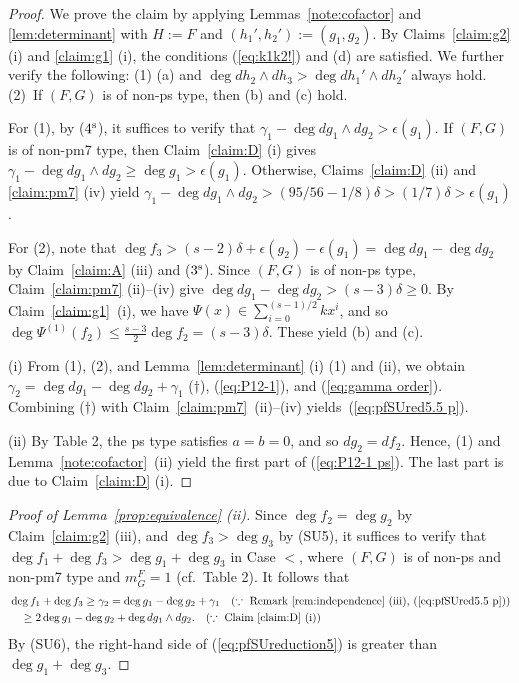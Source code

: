 \documentclass{amsart}
\theoremstyle{plain}
\theoremstyle{definition}
\newcommand{\ep}{\epsilon}
\begin{document}
\begin{proof}
We prove the claim by applying 
Lemmas~\ref{note:cofactor} and \ref{lem:determinant} 
with $H:=F$ and $(h_1',h_2'):=(g_1,g_2)$. 
By Claims~\ref{claim:g2} (i) and \ref{claim:g1} (i), 
the conditions 
(\ref{eq:k1k2!}) and (d) are satisfied. 
We further verify the following: 
(1) (a) and $\deg dh_2\wedge dh_3>\deg dh_1'\wedge dh_2'$ 
always hold. 
(2)~If $(F,G)$ is of non-ps type, 
then (b) and (c) hold. 



For (1), 
by ($4^{\rm s}$), 
it suffices to verify that 
$\gamma _1-\deg dg_1\wedge dg_2>\ep (g_1)$. 
If $(F,G)$ is of non-pm7 type, 
then Claim~\ref{claim:D} (i) gives 
$\gamma _1-\deg dg_1\wedge dg_2\ge \deg g_1>\ep (g_1)$. 
Otherwise, 
Claims~\ref{claim:D} (ii) and \ref{claim:pm7} (iv) yield 
$\gamma _1-\deg dg_1\wedge dg_2>(95/56-1/8)\delta >(1/7)\delta >\ep (g_1)$. 



For (2), 
note that 
$\deg f_3>(s-2)\delta +\ep (g_2)-\ep (g_1)=\deg dg_1-\deg dg_2$ 
by Claim~\ref{claim:A} (iii) and ($3^{\rm s}$). 
Since $(F,G)$ is of non-ps type, 
Claim~\ref{claim:pm7} (ii)--(iv) give 
$\deg dg_1-\deg dg_2>(s-3)\delta \ge 0$. 
By Claim~\ref{claim:g1}~(i), 
we have $\Psi (x)\in \sum _{i=0}^{(s-1)/2}kx^i$, 
and so $\deg \Psi ^{(1)}(f_2)\le \frac{s-3}{2}\deg f_2=(s-3)\delta $. 
These yield (b) and (c). 



(i) 
From (1), (2), 
and Lemma~\ref{lem:determinant} (i) (1) and (ii), 
we obtain 
$\gamma _2=\deg dg_1-\deg dg_2+\gamma _1$ ($\dag $), 
(\ref{eq:P12-1}), and (\ref{eq:gamma order}). 
Combining ($\dag $) with 
Claim~\ref{claim:pm7}~(ii)--(iv) yields~(\ref{eq:pfSUred5.5 p}). 


(ii) 
By Table 2, 
the ps type satisfies $a=b=0$, 
and so $dg_2=df_2$. 
Hence, 
(1) and Lemma~\ref{note:cofactor}~(ii) yield 
the first part of (\ref{eq:P12-1 ps}). 
The last part is due to Claim~\ref{claim:D} (i). 
\end{proof}



\begin{proof}[Proof of Lemma~{\rm \ref{prop:equivalence} (ii)}]
Since $\deg f_2=\deg g_2$ by Claim~\ref{claim:g2} (iii), 
and $\deg f_3>\deg g_3$ by (SU5), 
it suffices to verify that 
$\deg f_1+\deg f_3>\deg g_1+\deg g_3$ in Case $<$, 
where $(F,G)$ is of non-ps and non-pm7 type and $m_G^F=1$ 
(cf.\ Table 2). 
It follows that 
\begin{equation}\label{eq:pfSUreduction5}
\begin{aligned}
&\deg f_1+\deg f_3\ge \gamma _2
=\deg g_1-\deg g_2+\gamma _1 
\quad (\because \ \text{Remark~\ref{rem:independence} (iii), 
(\ref{eq:pfSUred5.5 p})}) \\
&\quad 
\ge 2\deg g_1-\deg g_2+\deg dg_1\wedge dg_2.
\quad (\because \ \text{Claim~\ref{claim:D} (i)}) 
\end{aligned}
\end{equation}
By (SU6), 
the right-hand side of (\ref{eq:pfSUreduction5}) 
is greater than $\deg g_1+\deg g_3$. 
\end{proof}
\end{document}
